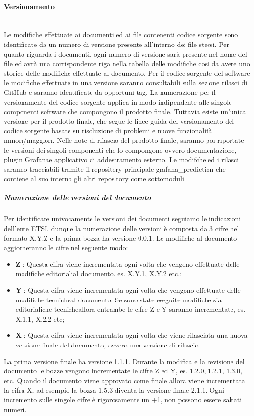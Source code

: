 		\paragraph{Versionamento}\mbox{}\\ [1mm]
		Le modifiche effettuate ai documenti ed ai file contenenti codice sorgente sono identificate da un numero di versione presente all'interno dei file stessi. Per quanto riguarda i documenti, ogni numero di versione sarà presente nel nome del file ed avrà una corrispondente riga nella tabella delle modifiche così da avere uno storico delle modifiche effettuate al documento. Per il codice sorgente del software le modifiche effettuate in una versione saranno consultabili sulla sezione rilasci di GitHub e saranno identificate da opportuni tag.
		\newline
		La numerazione per il versionamento del codice sorgente applica in modo indipendente alle singole componenti software che compongono il prodotto finale. Tuttavia esiste un'unica versione per il prodotto finale, che segue le linee guida del versionamento del codice sorgente basate su risoluzione di problemi e nuove funzionalità minori/maggiori. Nelle note di rilascio del prodotto finale, saranno poi riportate le versioni dei singoli componenti che lo compongono ovvero documentazione, plugin Grafana\glosp e applicativo di addestramento esterno. Le modifche ed i rilasci saranno tracciabili tramite il repository principale grafana\_prediction che contiene al suo interno gli altri repository come sottomoduli.
		\subparagraph*{Numerazione delle versioni del documento}
		Per identificare univocamente le versioni dei documenti seguiamo le indicazioni dell'ente ETSI, dunque la numerazione delle versioni è composta da 3 cifre nel formato X.Y.Z e la prima bozza ha versione 0.0.1. Le modifiche al documento aggiorneranno le cifre nel seguente modo:
		\begin{itemize}
			\item \textbf{Z} : Questa cifra viene incrementata ogni volta che vengono effettuate delle modifiche editoriali\glosp al documento, es. X.Y.1, X.Y.2 etc.;
			\item \textbf{Y} : Questa cifra viene incrementata ogni volta che vengono effettuate delle modifiche tecniche\glosp al documento. Se sono state eseguite modifiche sia editoriali\glosp che tecniche\glosp allora entrambe le cifre Z e Y saranno incrementate, es. X.1.1, X.2.2 etc;
			\item \textbf{X} : Questa cifra viene incrementata ogni volta che viene rilasciata una nuova versione finale del documento, ovvero una versione di rilascio.			
		\end{itemize}
		La prima versione finale ha versione 1.1.1.
		\newline
		Durante la modifica e la revisione del documento le bozze vengono incrementate le cifre Z ed Y, es. 1.2.0, 1.2.1, 1.3.0, etc.
		\newline
		Quando il documento viene approvato come finale allora viene incrementata la cifra X, ad esempio la bozza 1.5.3 diventa la versione finale 2.1.1.
		\newline
		Ogni incremento sulle singole cifre è rigorosamente un +1, non possono essere saltati numeri.
		
